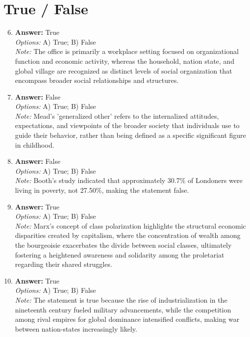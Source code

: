 \documentclass[12pt]{article}
\begin{document}
\section*{True / False}
\begin{enumerate}[label=\arabic*.]
\setcounter{enumi}{5}
\item \textbf{Answer:} True
\\ \textit{Options:} A) True; B) False
\\ \textit{Note:} The office is primarily a workplace setting focused on organizational function and economic activity, whereas the household, nation state, and global village are recognized as distinct levels of social organization that encompass broader social relationships and structures.
\item \textbf{Answer:} False
\\ \textit{Options:} A) True; B) False
\\ \textit{Note:} Mead's 'generalized other' refers to the internalized attitudes, expectations, and viewpoints of the broader society that individuals use to guide their behavior, rather than being defined as a specific significant figure in childhood.
\item \textbf{Answer:} False
\\ \textit{Options:} A) True; B) False
\\ \textit{Note:} Booth's study indicated that approximately 30.7\% of Londoners were living in poverty, not 27.50\%, making the statement false.
\item \textbf{Answer:} True
\\ \textit{Options:} A) True; B) False
\\ \textit{Note:} Marx's concept of class polarization highlights the structural economic disparities created by capitalism, where the concentration of wealth among the bourgeoisie exacerbates the divide between social classes, ultimately fostering a heightened awareness and solidarity among the proletariat regarding their shared struggles.
\item \textbf{Answer:} True
\\ \textit{Options:} A) True; B) False
\\ \textit{Note:} The statement is true because the rise of industrialization in the nineteenth century fueled military advancements, while the competition among rival empires for global dominance intensified conflicts, making war between nation-states increasingly likely.
\end{enumerate}
\end{document}

